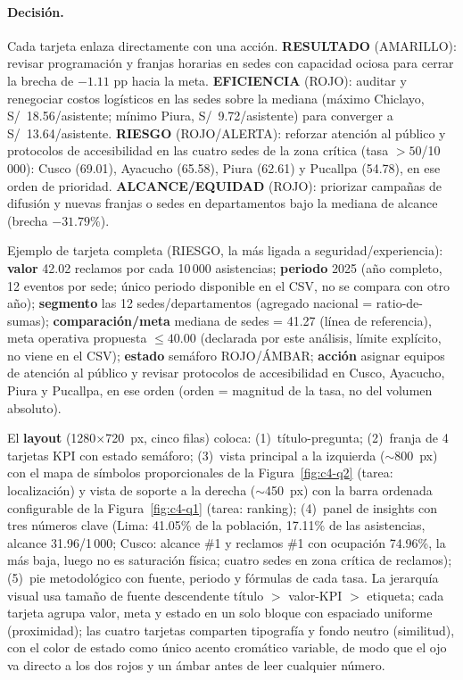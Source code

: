 \paragraph{Decisión.} Cada tarjeta enlaza directamente con una acción. \textbf{RESULTADO} (AMARILLO): revisar programación y franjas horarias en sedes con capacidad ociosa para cerrar la brecha de $-1.11$ pp hacia la meta. \textbf{EFICIENCIA} (ROJO): auditar y renegociar costos logísticos en las sedes sobre la mediana (máximo Chiclayo, S/~18.56/asistente; mínimo Piura, S/~9.72/asistente) para converger a S/~13.64/asistente. \textbf{RIESGO} (ROJO/ALERTA): reforzar atención al público y protocolos de accesibilidad en las cuatro sedes de la zona crítica (tasa $>50$/10\,000): Cusco (69.01), Ayacucho (65.58), Piura (62.61) y Pucallpa (54.78), en ese orden de prioridad. \textbf{ALCANCE/EQUIDAD} (ROJO): priorizar campañas de difusión y nuevas franjas o sedes en departamentos bajo la mediana de alcance (brecha $-31.79\%$).

Ejemplo de tarjeta completa (RIESGO, la más ligada a seguridad/experiencia): \textbf{valor} 42.02 reclamos por cada 10\,000 asistencias; \textbf{periodo} 2025 (año completo, 12 eventos por sede; único periodo disponible en el CSV, no se compara con otro año); \textbf{segmento} las 12 sedes/departamentos (agregado nacional = ratio-de-sumas); \textbf{comparación/meta} mediana de sedes = 41.27 (línea de referencia), meta operativa propuesta $\leq 40.00$ (declarada por este análisis, límite explícito, no viene en el CSV); \textbf{estado} semáforo ROJO/ÁMBAR; \textbf{acción} asignar equipos de atención al público y revisar protocolos de accesibilidad en Cusco, Ayacucho, Piura y Pucallpa, en ese orden (orden = magnitud de la tasa, no del volumen absoluto).

El \textbf{layout} (1280$\times$720~px, cinco filas) coloca: (1)~título-pregunta; (2)~franja de 4 tarjetas KPI con estado semáforo; (3)~vista principal a la izquierda ($\sim$800~px) con el mapa de símbolos proporcionales de la Figura~\ref{fig:c4-q2} (tarea: localización) y vista de soporte a la derecha ($\sim$450~px) con la barra ordenada configurable de la Figura~\ref{fig:c4-q1} (tarea: ranking); (4)~panel de insights con tres números clave (Lima: 41.05\% de la población, 17.11\% de las asistencias, alcance 31.96/1\,000; Cusco: alcance \#1 y reclamos \#1 con ocupación 74.96\%, la más baja, luego no es saturación física; cuatro sedes en zona crítica de reclamos); (5)~pie metodológico con fuente, periodo y fórmulas de cada tasa. La jerarquía visual usa tamaño de fuente descendente título $>$ valor-KPI $>$ etiqueta; cada tarjeta agrupa valor, meta y estado en un solo bloque con espaciado uniforme (proximidad); las cuatro tarjetas comparten tipografía y fondo neutro (similitud), con el color de estado como único acento cromático variable, de modo que el ojo va directo a los dos rojos y un ámbar antes de leer cualquier número.

